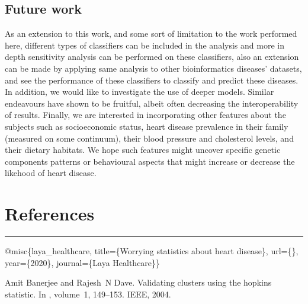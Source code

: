 \documentclass[letterpaper,10pt,english]{jupyterBook}
\begin{document}
\section{Future work}
\label{\detokenize{Conclusion:future-work}}
\sphinxAtStartPar
As an extension to this work, and some sort of limitation to the work performed here,
different types of classifiers can be included in the analysis and more in depth sensitivity analysis can be performed on these classifiers, also an extension can be made by applying same analysis to other bioinformatics diseases’ datasets, and see the performance of these classifiers to classify and predict these diseases. In addition, we would like to investigate the use of deeper models. Similar endeavours have shown to be fruitful, albeit often decreasing the interoperability of results.  Finally, we are interested in incorporating other features about the subjects such as socio\sphinxhyphen{}economic status,  heart disease prevalence in their family (measured on some continuum), their blood pressure and  cholesterol levels, and their dietary habitats. We hope such features might uncover specific genetic components  patterns or behavioural aspects that might increase or decrease the likehood of heart disease.

\sphinxstepscope


\chapter{References}
\label{\detokenize{References:references}}\label{\detokenize{References::doc}}

\bigskip\hrule\bigskip


\sphinxAtStartPar
@misc\{laya\_healthcare,
title=\{Worrying statistics about heart disease\}, url=\{\},
year=\{2020\},
journal=\{Laya Healthcare\}\}

\begin{sphinxthebibliography}{1}
\sphinxAtStartPar
Amit Banerjee and Rajesh N Dave. Validating clusters using the hopkins statistic. In , volume 1, 149–153. IEEE, 2004.
\end{sphinxthebibliography}







\renewcommand{\indexname}{Index}
\printindex
\end{document}
